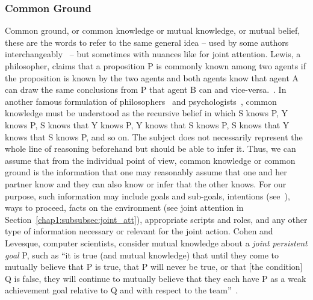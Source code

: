 \documentclass[a4paper,11pt,twoside]{StyleThese}
\begin{document}
\subsubsection{Common Ground}
Common ground, or common knowledge or mutual knowledge, or mutual belief, these are the words to refer to the same general idea -- used by some authors interchangeably~\cite{clark_1992_arenas, clark_1996_using} -- but sometimes with nuances like for joint attention. Lewis, a philosopher, claims that a proposition P is commonly known among two agents if the proposition is known by the two agents and both agents know that agent A can draw the same conclusions from P that agent B can and vice-versa.~\cite{lewis_1969_convention}. In another famous formulation of philosophers~\cite{schiffer_1972_meaning} and psychologists~\cite{thomas_2014_psychology}, common knowledge must be understood as the recursive belief in which S knows P, Y knows P, S knows that Y knows P, Y knows that S knows P, S knows that Y knows that S knows P, and so on. The subject does not necessarily represent the whole line of reasoning beforehand but should be able to infer it. Thus, we can assume that from the individual point of view, common knowledge or common ground is the information that one may reasonably assume that one and her partner know and they can also know or infer that the other knows. For our purpose, such information may include goals and sub-goals, intentions (see~\cite{bratman_1992_coop}), ways to proceed, facts on the environment (see joint attention in Section~\ref{chap1:subsubsec:joint_att}), appropriate scripts and roles, and any other type of information necessary or relevant for the joint action. Cohen and Levesque, computer scientists, consider mutual knowledge about a \textit{joint persistent goal} P, such as ``it is true (and mutual knowledge) that until they come to mutually believe that P is true, that P will never be true, or that [the condition] Q is false, they will continue to mutually believe that they each have P as a weak achievement goal relative to Q and with respect to the team''~\cite[p.~499]{cohen_1991_teamwork}.
\end{document}
